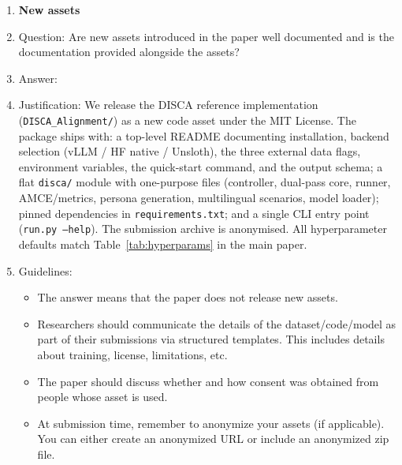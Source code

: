 \begin{enumerate}
\item {\bf New assets}
    \item[] Question: Are new assets introduced in the paper well documented and is the documentation provided alongside the assets?
    \item[] Answer: \answerYes{}
    \item[] Justification: We release the DISCA reference implementation (\texttt{DISCA\_Alignment/}) as a new code asset under the MIT License. The package ships with: a top-level README documenting installation, backend selection (vLLM / HF native / Unsloth), the three external data flags, environment variables, the quick-start command, and the output schema; a flat \texttt{disca/} module with one-purpose files (controller, dual-pass core, runner, AMCE/metrics, persona generation, multilingual scenarios, model loader); pinned dependencies in \texttt{requirements.txt}; and a single CLI entry point (\texttt{run.py --help}). The submission archive is anonymised. All hyperparameter defaults match Table~\ref{tab:hyperparams} in the main paper.
    \item[] Guidelines:
    \begin{itemize}
        \item The answer \answerNA{} means that the paper does not release new assets.
        \item Researchers should communicate the details of the dataset\slash code\slash model as part of their submissions via structured templates. This includes details about training, license, limitations, etc. 
        \item The paper should discuss whether and how consent was obtained from people whose asset is used.
        \item At submission time, remember to anonymize your assets (if applicable). You can either create an anonymized URL or include an anonymized zip file.
    \end{itemize}


\end{enumerate}
